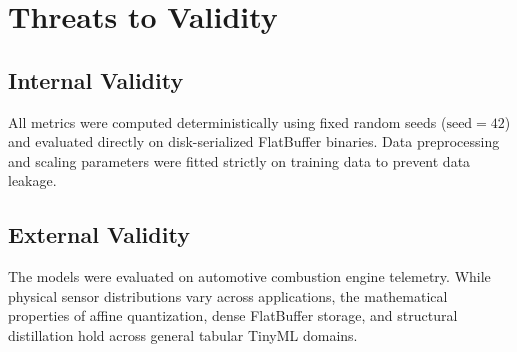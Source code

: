 \documentclass[journal,10pt]{IEEEtran}
\begin{document}
\section{Threats to Validity}
\subsection{Internal Validity}
All metrics were computed deterministically using fixed random seeds ($\text{seed}=42$) and evaluated directly on disk-serialized FlatBuffer binaries. Data preprocessing and scaling parameters were fitted strictly on training data to prevent data leakage.

\subsection{External Validity}
The models were evaluated on automotive combustion engine telemetry. While physical sensor distributions vary across applications, the mathematical properties of affine quantization, dense FlatBuffer storage, and structural distillation hold across general tabular TinyML domains.
\end{document}
